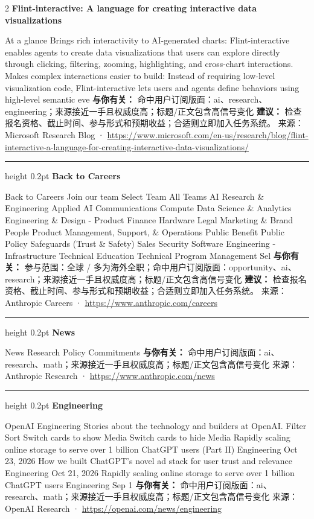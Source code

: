\documentclass[10.5pt]{ctexart}
\begin{document}
\begin{multicols}{2}
{\large\bfseries Flint-interactive: A language for creating interactive data visualizations}\par
At a glance Brings rich interactivity to AI-generated charts: Flint-interactive enables agents to create data visualizations that users can explore directly through clicking, filtering, zooming, highlighting, and cross-chart interactions. Makes complex interactions easier to build: Instead of requiring low-level visualization code, Flint-interactive lets users and agents define behaviors using high-level semantic eve
\textbf{与你有关：} 命中用户订阅版面：ai、research、engineering；来源接近一手且权威度高；标题/正文包含高信号变化
\textbf{建议：} 检查报名资格、截止时间、参与形式和预期收益；合适则立即加入任务系统。
{\footnotesize\color{ormuted} 来源：Microsoft Research Blog · \url{https://www.microsoft.com/en-us/research/blog/flint-interactive-a-language-for-creating-interactive-data-visualizations/}}
\vspace{2mm}
\hrule height 0.2pt
\vspace{2mm}
{\large\bfseries Back to Careers}\par
Back to Careers Join our team Select Team All Teams AI Research \& Engineering Applied AI Communications Compute Data Science \& Analytics Engineering \& Design - Product Finance Hardware Legal Marketing \& Brand People Product Management, Support, \& Operations Public Benefit Public Policy Safeguards (Trust \& Safety) Sales Security Software Engineering - Infrastructure Technical Education Technical Program Management Sel
\textbf{与你有关：} 参与范围：全球 / 多为海外全职；命中用户订阅版面：opportunity、ai、research；来源接近一手且权威度高；标题/正文包含高信号变化
\textbf{建议：} 检查报名资格、截止时间、参与形式和预期收益；合适则立即加入任务系统。
{\footnotesize\color{ormuted} 来源：Anthropic Careers · \url{https://www.anthropic.com/careers}}
\vspace{2mm}
\hrule height 0.2pt
\vspace{2mm}
{\large\bfseries News}\par
News Research Policy Commitments
\textbf{与你有关：} 命中用户订阅版面：ai、research、math；来源接近一手且权威度高；标题/正文包含高信号变化
{\footnotesize\color{ormuted} 来源：Anthropic Research · \url{https://www.anthropic.com/news}}
\vspace{2mm}
\hrule height 0.2pt
\vspace{2mm}
{\large\bfseries Engineering}\par
OpenAI Engineering Stories about the technology and builders at OpenAI. Filter Sort Switch cards to show Media Switch cards to hide Media Rapidly scaling online storage to serve over 1 billion ChatGPT users (Part II) Engineering Oct 23, 2026 How we built ChatGPT’s novel ad stack for user trust and relevance Engineering Oct 21, 2026 Rapidly scaling online storage to serve over 1 billion ChatGPT users Engineering Sep 1
\textbf{与你有关：} 命中用户订阅版面：ai、research、math；来源接近一手且权威度高；标题/正文包含高信号变化
{\footnotesize\color{ormuted} 来源：OpenAI Research · \url{https://openai.com/news/engineering}}
\end{multicols}
\end{document}
